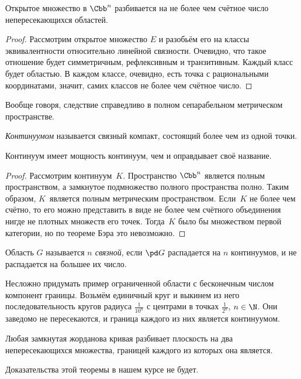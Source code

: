 \documentclass[a4paper]{article}
\begin{document}
\begin{theorem}
Открытое множество в $\Cbb^n$ разбивается на не более чем счётное число непересекающихся областей.
\end{theorem}
\begin{proof}
Рассмотрим открытое множество $E$ и разобьём его на классы эквивалентности относительно линейной связности.
Очевидно, что такое отношение будет симметричным, рефлексивным и транзитивным. Каждый класс будет областью.
В каждом классе, очевидно, есть точка с рациональными координатами, значит, самих классов не более чем
счётное число.
\end{proof}

\begin{note}
Вообще говоря, следствие справедливо в полном сепарабельном метрическом пространстве.
\end{note}

\begin{df}
\emph{Континуумом} называется связный компакт, состоящий более чем из одной точки.
\end{df}

\begin{stm}
Континуум имеет мощность континуум, чем и оправдывает своё название.
\end{stm}
\begin{proof}
Рассмотрим континуум~$K$. Пространство $\Cbb^n$ является полным пространством,
а замкнутое подмножество полного пространства полно. Таким образом, $K$~является
полным метрическим пространством. Если~$K$ не более чем счётно, то его
можно представить в виде не более чем счётного объединения нигде не плотных множеств его точек.
Тогда~$K$ было бы множеством первой категории, но по теореме Бэра это невозможно.
\end{proof}

\begin{df}
Область $G$ называется \emph{$n$ связной}, если $\pd G$ распадается на $n$ континуумов, и не распадается на
большее их число.
\end{df}

Несложно придумать пример ограниченной области с бесконечным числом компонент границы. Возьмём единичный
круг и выкинем из него последовательность кругов радиуса $\frac{1}{10^n}$ с центрами в точках $\frac{1}{2^n}$, $n\in\N$.
Они заведомо не пересекаются, и граница каждого из них является континуумом.

\begin{theorem}[Жордана]
Любая замкнутая жорданова кривая разбивает плоскость на два непересекающихся множества, границей каждого
из которых она является.
\end{theorem}
Доказательства этой теоремы в нашем курсе не будет.
\end{document}
